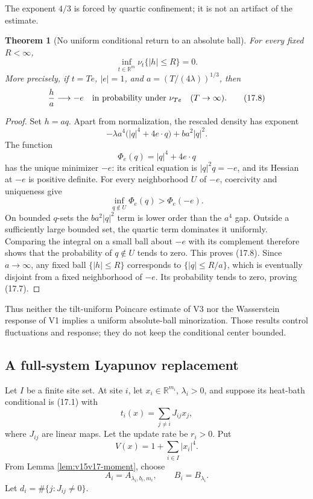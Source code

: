 \documentclass[11pt]{article}
\newtheorem{theorem}{Theorem}[section]
\theoremstyle{remark}
\begin{document}
The exponent \(4/3\) is forced by quartic confinement; it is not an
artifact of the estimate.

\begin{theorem}[No uniform conditional return to an absolute ball]
\label{thm:v15v17-no-ball}
For every fixed \(R<\infty\),
\[
 \boxed{
 \inf_{t\in\mathbb R^m}\nu_t\{|h|\le R\}=0.}                \tag{17.7}
\]
More precisely, if \(t=T e\), \(|e|=1\), and
\(a=(T/(4\lambda))^{1/3}\), then
\[
 \frac{h}{a}\longrightarrow -e
 \quad\hbox{in probability under }\nu_{Te}
 \quad(T\to\infty).                                         \tag{17.8}
\]
\end{theorem}

\begin{proof}
Set \(h=aq\).  Apart from normalization, the rescaled density has
exponent
\[
 -\lambda a^4\bigl(|q|^4+4e\cdot q\bigr)+ba^2|q|^2.         \tag{17.9}
\]
The function
\[
 \Phi_e(q)=|q|^4+4e\cdot q
\]
has the unique minimizer \(-e\): its critical equation is
\(|q|^2q=-e\), and its Hessian at \(-e\) is positive definite.
For every neighborhood \(U\) of \(-e\), coercivity and uniqueness
give
\[
 \inf_{q\notin U}\Phi_e(q)
 >
 \Phi_e(-e).                                                \tag{17.10}
\]
On bounded \(q\)-sets the \(ba^2|q|^2\) term is lower order than
the \(a^4\) gap.  Outside a sufficiently large bounded set, the
quartic term dominates it uniformly.  Comparing the integral on a
small ball about \(-e\) with its complement therefore shows that
the probability of \(q\notin U\) tends to zero.  This proves
(17.8).  Since \(a\to\infty\), any fixed ball
\(\{|h|\le R\}\) corresponds to \(\{|q|\le R/a\}\), which is
eventually disjoint from a fixed neighborhood of \(-e\).  Its
probability tends to zero, proving (17.7).
\end{proof}

Thus neither the tilt-uniform Poincare estimate of V3 nor the
Wasserstein response of V1 implies a uniform absolute-ball
minorization.  Those results control fluctuations and response;
they do not keep the conditional center bounded.

\subsection{A full-system Lyapunov replacement}

Let \(I\) be a finite site set.  At site \(i\), let
\(x_i\in\mathbb R^{m_i}\), \(\lambda_i>0\), and suppose its
heat-bath conditional is (17.1) with
\[
 t_i(x)=\sum_{j\ne i}J_{ij}x_j,                             \tag{17.11}
\]
where \(J_{ij}\) are linear maps.  Let the update rate be \(r_i>0\).
Put
\[
 V(x)=1+\sum_{i\in I}|x_i|^4.                               \tag{17.12}
\]
From Lemma \ref{lem:v15v17-moment}, choose
\[
 A_i=A_{\lambda_i,b_i,m_i},\qquad
 B_i=B_{\lambda_i}.                                         \tag{17.13}
\]
Let \(d_i=\#\{j:J_{ij}\ne0\}\).
\end{document}
